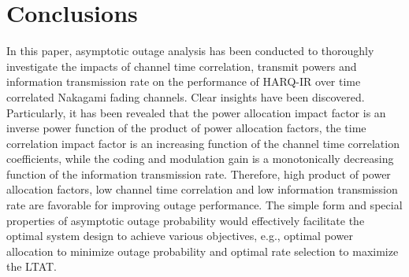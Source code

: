 \documentclass[12pt,onecolumn,draftcls]{IEEEtran}
\begin{document}
\section{Conclusions} \label{sec:con}
In this paper, asymptotic outage analysis has been conducted to thoroughly investigate the impacts of channel time correlation, transmit powers and information transmission rate on the performance of HARQ-IR over time correlated Nakagami fading channels. Clear insights have been discovered. Particularly, it has been revealed that the power allocation impact factor is an inverse power function of the product of power allocation factors, the time correlation impact factor is an increasing function of the channel time correlation coefficients, while the coding and modulation gain is a monotonically decreasing function of the information transmission rate. Therefore, high product of power allocation factors, low channel time correlation and low information transmission rate are favorable for improving outage performance. The simple form and special properties of asymptotic outage probability would effectively facilitate the optimal system design to achieve various objectives, e.g., optimal power allocation to minimize outage probability and optimal rate selection to maximize the LTAT.

\appendices
\end{document}
